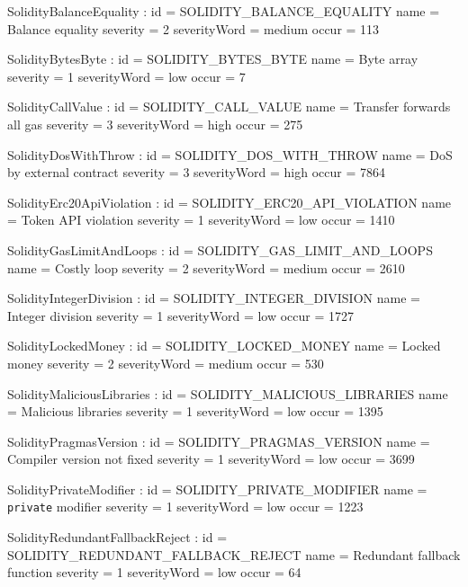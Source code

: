 

\let\letcs\texapiletcs %

\setparameter SolidityBalanceEquality :
id 				= SOLIDITY\_BALANCE\_EQUALITY
name 			= {Balance equality}
severity 		= 2
severityWord 	= medium
occur			= 113

\setparameter SolidityBytesByte :
id 				= SOLIDITY\_BYTES\_BYTE
name 			= {Byte array}
severity 		= 1
severityWord 	= low
occur			= 7

\setparameter SolidityCallValue :
id 				= SOLIDITY\_CALL\_VALUE
name 			= {Transfer forwards all gas}
severity 		= 3
severityWord 	= high
occur			= 275

\setparameter SolidityDosWithThrow :
id 				= SOLIDITY\_DOS\_WITH\_THROW
name 			= {DoS by external contract}
severity 		= 3
severityWord 	= high
occur			= 7864

\setparameter SolidityErc20ApiViolation :
id 				= SOLIDITY\_ERC20\_API\_VIOLATION
name 			= {Token API violation}
severity 		= 1
severityWord 	= low
occur			= 1410

\setparameter SolidityGasLimitAndLoops :
id 				= SOLIDITY\_GAS\_LIMIT\_AND\_LOOPS
name 			= {Costly loop}
severity 		= 2
severityWord 	= medium
occur			= 2610

\setparameter SolidityIntegerDivision :
id 				= SOLIDITY\_INTEGER\_DIVISION
name 			= {Integer division}
severity 		= 1
severityWord 	= low
occur			= 1727

\setparameter SolidityLockedMoney :
id 				= SOLIDITY\_LOCKED\_MONEY
name 			= {Locked money}
severity 		= 2
severityWord 	= medium
occur			= 530

\setparameter SolidityMaliciousLibraries :
id 				= SOLIDITY\_MALICIOUS\_LIBRARIES
name 			= {Malicious libraries}
severity 		= 1
severityWord 	= low
occur			= 1395

\setparameter SolidityPragmasVersion :
id 				= SOLIDITY\_PRAGMAS\_VERSION
name 			= {Compiler version not fixed}
severity 		= 1
severityWord 	= low
occur			= 3699

\setparameter SolidityPrivateModifier :
id 				= SOLIDITY\_PRIVATE\_MODIFIER
name 			= {\texttt{private} modifier}
severity 		= 1
severityWord 	= low
occur			= 1223

\setparameter SolidityRedundantFallbackReject :
id 				= SOLIDITY\_REDUNDANT\_FALLBACK\_REJECT
name 			= {Redundant fallback function}
severity 		= 1
severityWord 	= low
occur			= 64

